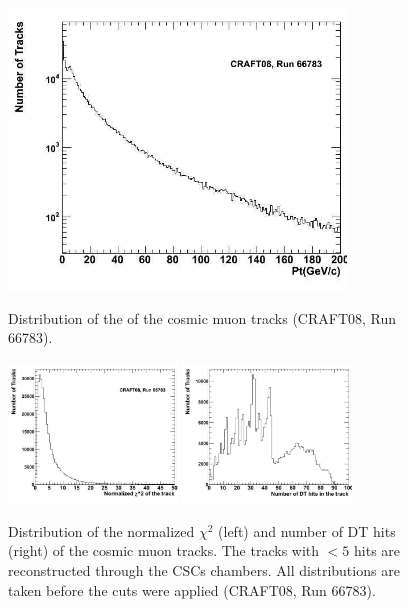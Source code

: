 \begin{figure}[hbtp]

     \begin{minipage}{1.0\textwidth}
     \begin{center}
      \includegraphics[width=0.8\textwidth]{pt_sta}
       \caption{ 
Distribution of the \pt of the cosmic muon tracks (CRAFT08, Run 66783). 
}
      \label{fig:pttrack}
  \end{center}
  \end{minipage}
     
 \begin{minipage}{1.0\textwidth}
  \begin{center}
 
     \includegraphics[width=0.4\textwidth]{chi2_sta}
     \includegraphics[width=0.4\textwidth]{num_hits_sta}
\caption{Distribution of the normalized $\chi^2$ (left) and number of DT hits (right) 
of the cosmic muon tracks. The tracks with $< 5$ hits
are reconstructed through the CSCs chambers. 
All distributions are taken before the cuts were applied (CRAFT08, Run 66783).
}
      \label{fig:nhitschi2}
  \end{center}
  \end{minipage}

\end{figure}

